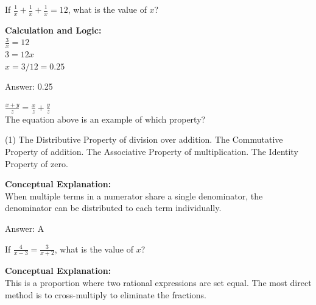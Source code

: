 \documentclass[11pt,paper=a4,answers]{exam}
\begin{document}
\begin{questions}
\question
If $\frac{1}{x} + \frac{1}{x} + \frac{1}{x} = 12$, what is the value of $x$?

\begin{solution}
\textbf{Calculation and Logic:} \\
$\frac{3}{x} = 12$ \\
$3 = 12x$ \\
$x = 3/12 = 0.25$

\vspace{25pt}

Answer: \colorbox{yellow!100}{0.25}
\end{solution}

\vspace{40pt}

\question
$\frac{x+y}{z} = \frac{x}{z} + \frac{y}{z}$ \\
The equation above is an example of which property?
\begin{tasks}(1)
    \task The Distributive Property of division over addition.
    \task The Commutative Property of addition.
    \task The Associative Property of multiplication.
    \task The Identity Property of zero.
\end{tasks}

\begin{solution}
\textbf{Conceptual Explanation:} \\
When multiple terms in a numerator share a single denominator, the denominator can be distributed to each term individually.

\vspace{25pt}

Answer: \colorbox{yellow!100}{A}
\end{solution}



\question
If $\frac{4}{x-3} = \frac{3}{x+2}$, what is the value of $x$?

\begin{solution}
\textbf{Conceptual Explanation:} \\
This is a proportion where two rational expressions are set equal. The most direct method is to cross-multiply to eliminate the fractions.

\vspace{30pt}


\end{solution}
\end{questions}
\end{document}
